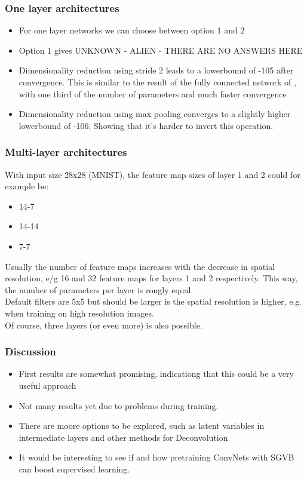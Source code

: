 \documentclass{beamer}
\begin{document}
\begin{frame}
\frametitle{One layer architectures}

\begin{itemize}
	\item For one layer networks we can choose between option 1 and 2
	\item Option 1 gives UNKNOWN - ALIEN - THERE ARE NO ANSWERS HERE
	\item Dimensionality reduction using stride 2 leads to a lowerbound of -105 after convergence. This is similar to the result of the fully connected network of \cite{kingma2013stochastic}, with one third of the number of parameters and much faster convergence
	\item Dimensionality reduction using max pooling converges to a slightly higher lowerbound of -106. Showing that it's  harder to invert this operation.
	\end{itemize}
\end{frame}

\begin{frame}
\frametitle{Multi-layer architectures}
With input size 28x28 (MNIST), the feature map sizes of layer 1 and 2 could for example be:
\begin{itemize}
\item 14-7 
\item 14-14
\item 7-7
\end{itemize}
Usually the number of feature maps increases with the decrease in spatial resolution, e/g 16 and 32 feature maps for layers 1 and 2 respectively. This way, the number of parameters per layer is rougly equal. \\
Default filters are 5x5 but should be larger is the spatial resolution is higher, e.g. when training on high resolution images. \\
Of course, three layers (or even more) is also possible.
\end{frame}

\begin{frame}
\frametitle{Discussion}
	\begin{itemize}
		\item First results are somewhat promising, indicationg that this could be a very useful approach
		\item Not many results yet due to problems during training.
		\item There are moore options to be explored, such as latent variables in intermediate layers and other methods for Deconvolution
		\item It would be interesting to see if and how pretraining ConvNets with SGVB can boost supervised learning.
	\end{itemize}
\end{frame}
\end{document}
